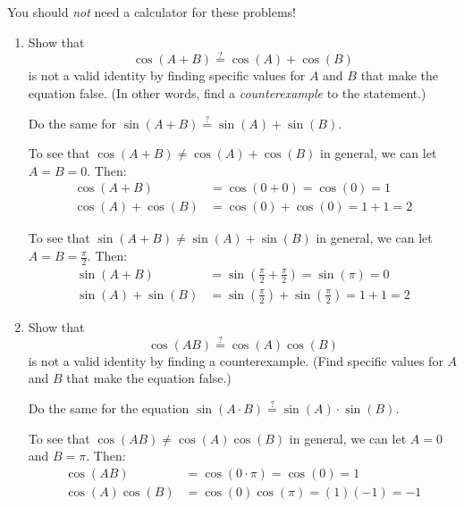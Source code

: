 \documentclass{article}
\begin{document}
\begin{enumerate}[topsep=0pt]
You should \textit{not} need a calculator for these problems!

\begin{enumerate}
    \item 
    \begin{problem}[\vfill]
    Show that \[\cos(A+B) \stackrel{?}{=} \cos(A)+\cos(B)\] is not a valid identity by finding specific values for $A$ and $B$ that make the equation false. (In other words, find a \textit{counterexample} to the statement.)

    Do the same for $\sin(A+B) \stackrel{?}{=} \sin(A)+\sin(B)$.
    \end{problem}

    \begin{solution}
        To see that $\cos(A+B)\ne \cos(A)+\cos(B)$ in general, we can let $A=B=0$. Then:
        \begin{align*}
            \cos(A+B) &= \cos\left(0+0\right)=\cos(0)=\boxed{1}\\
            \cos(A)+\cos(B) &= \cos\left(0\right)+\cos\left(0\right)=1+1=\boxed{2}
        \end{align*}
        
        To see that $\sin(A+B)\ne \sin(A)+\sin(B)$ in general, we can let $A=B=\frac{\pi}{2}$. Then:
        \begin{align*}
            \sin(A+B) &= \sin\left(\frac{\pi}{2}+\frac{\pi}{2}\right)=\sin(\pi)=\boxed{0}\\
            \sin(A)+\sin(B) &= \sin\left(\frac{\pi}{2}\right)+\sin\left(\frac{\pi}{2}\right)=1+1=\boxed{2}
        \end{align*}

        
    \end{solution}

    \item 
    \begin{problem}[\vfill]
    Show that \[\cos(AB)\stackrel{?}{=} \cos(A)\cos(B)\] is not a valid identity by finding a counterexample. (Find specific values for $A$ and $B$ that make the equation false.)

    Do the same for the equation $\sin(A\cdot B)\stackrel{?}{=} \sin(A)\cdot\sin(B)$.
    \end{problem}

    \begin{solution}
        To see that $\cos(A B)\ne \cos(A)\cos(B)$ in general, we can let $A=0$ and $B=\pi$. Then:
        \begin{align*}
            \cos(AB) &= \cos(0\cdot\pi)=\cos(0)=\boxed{1}\\
            \cos(A)\cos(B) &= \cos(0)\cos(\pi)=(1)(-1)=\boxed{-1}
        \end{align*}
        

\end{solution}
\end{enumerate}
\end{enumerate}
\end{document}
